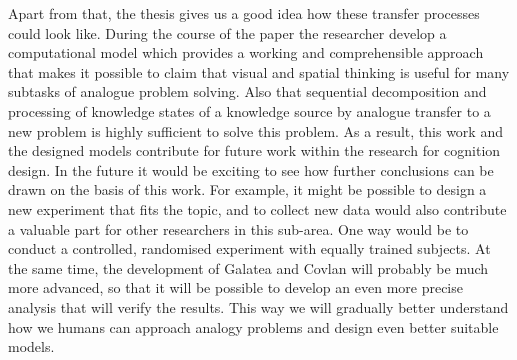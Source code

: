\documentclass[12pt]{article}
\begin{document}
Apart from that, the thesis gives us a good idea how these transfer processes could look like. During the course of the paper the researcher develop a computational model which provides a working and comprehensible approach that makes it possible to claim that visual and spatial thinking is useful for many subtasks of analogue problem solving. Also that sequential decomposition and processing of knowledge states of a knowledge source by analogue transfer to a new problem is highly sufficient to solve this problem. As a result, this work and the designed models contribute for future work within the research for cognition design. In the future it would be exciting to see how further conclusions can be drawn on the basis of this work. For example, it might be possible to design a new experiment that fits the topic, and to collect new data would also contribute a valuable part for other researchers in this sub-area. One way would be to conduct a controlled, randomised experiment with equally trained subjects. At the same time, the development of Galatea and Covlan will probably be much more advanced, so that it will be possible to develop an even more precise analysis that will verify the results. This way we will gradually better understand how we humans can approach analogy problems and design even better suitable models.



\noindent
\newpage



\end{document}
